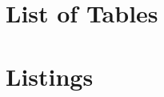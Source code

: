	
	
\chapter{List of Tables}
\makeatletter
{}%
\makeatother
\clearpage

\chapter{Listings}
\makeatletter
{}%
\makeatother
\clearpage



